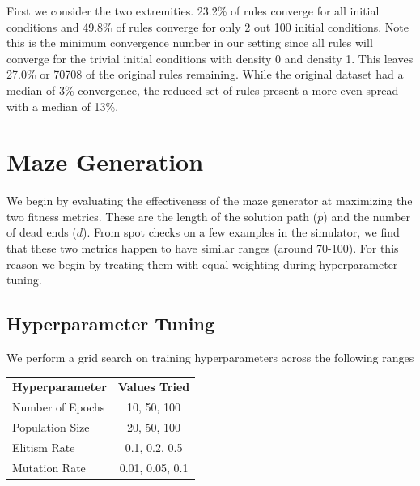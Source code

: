 First we consider the two extremities. 23.2\% of rules converge for all initial conditions and 49.8\% of rules converge for only 2 out 100 initial conditions. Note this is the minimum convergence number in our setting since all rules will converge for the trivial initial conditions with density 0 and density 1.  This leaves 27.0\% or 70708 of the original rules remaining. While the original dataset had a median of 3\% convergence, the reduced set of rules present a more even spread with a median of 13\%.

\section{Maze Generation}

We begin by evaluating the effectiveness of the maze generator at maximizing the two fitness metrics. These are the length of the solution path ($p$) and the number of dead ends ($d$). From spot checks on a few examples in the simulator, we find that these two metrics happen to have similar ranges (around 70-100). For this reason we begin by treating them with equal weighting during hyperparameter tuning.\\

\subsection{Hyperparameter Tuning}

We perform a grid search on training hyperparameters across the following ranges
\begin{center}
    \begin{tabular}{ l c }
        \bf Hyperparameter & \bf Values Tried\\
        Number of Epochs & 10, 50, 100\\
        Population Size & 20, 50, 100\\
        Elitism Rate & 0.1, 0.2, 0.5\\
        Mutation Rate & 0.01, 0.05, 0.1
    \end{tabular}
\end{center}

